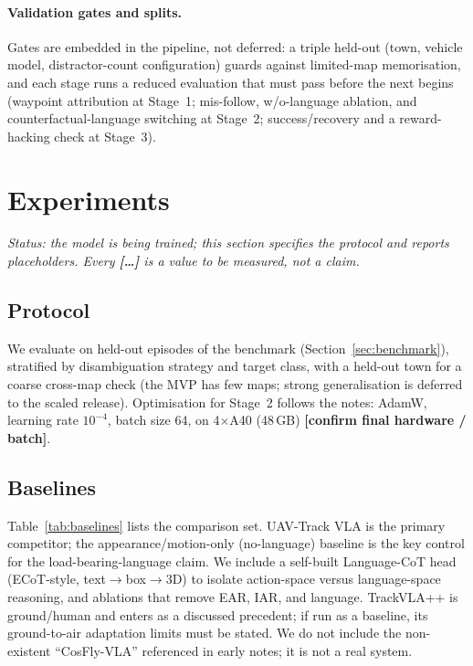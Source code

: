\documentclass[11pt]{article}
\newcommand{\ph}[1]{{\color{red}\textbf{[#1]}}}
\newcommand{\chk}[1]{{\color{orange}#1}}
\newcommand{\ear}{EAR}
\newcommand{\iar}{IAR}
\begin{document}
\paragraph{Validation gates and splits.}
Gates are embedded in the pipeline, not deferred: a triple held-out (town,
vehicle model, distractor-count configuration) guards against
limited-map memorisation, and each stage runs a reduced evaluation that must
pass before the next begins (waypoint attribution at Stage~1; mis-follow,
w/o-language ablation, and counterfactual-language switching at Stage~2;
success/recovery and a reward-hacking check at Stage~3).

\section{Experiments}
\label{sec:experiments}

\emph{Status: the model is being trained; this section specifies the
protocol and reports placeholders. Every \ph{\dots} is a value to be
measured, not a claim.}

\subsection{Protocol}
\label{sec:exp-protocol}
We evaluate on held-out episodes of the benchmark
(Section~\ref{sec:benchmark}), stratified by disambiguation strategy and
target class, with a held-out town for a coarse cross-map check (the MVP has
few maps; strong generalisation is deferred to the scaled release).
Optimisation for Stage~2 follows the notes: AdamW, learning rate
$10^{-4}$, batch size \chk{64}, on \chk{4$\times$A40 (48\,GB)} \ph{confirm
final hardware / batch}.

\subsection{Baselines}
\label{sec:exp-baselines}
Table~\ref{tab:baselines} lists the comparison set. UAV-Track VLA is the
primary competitor; the appearance/motion-only (no-language) baseline is the
key control for the load-bearing-language claim. We include a self-built
Language-CoT head (ECoT-style, text$\to$box$\to$3D) to isolate action-space
versus language-space reasoning, and ablations that remove \ear{}, \iar{},
and language. TrackVLA++ is ground/human and enters as a discussed precedent;
if run as a baseline, its ground-to-air adaptation limits must be stated. We
do not include the non-existent ``CosFly-VLA'' referenced in early notes;
it is not a real system.
\end{document}
